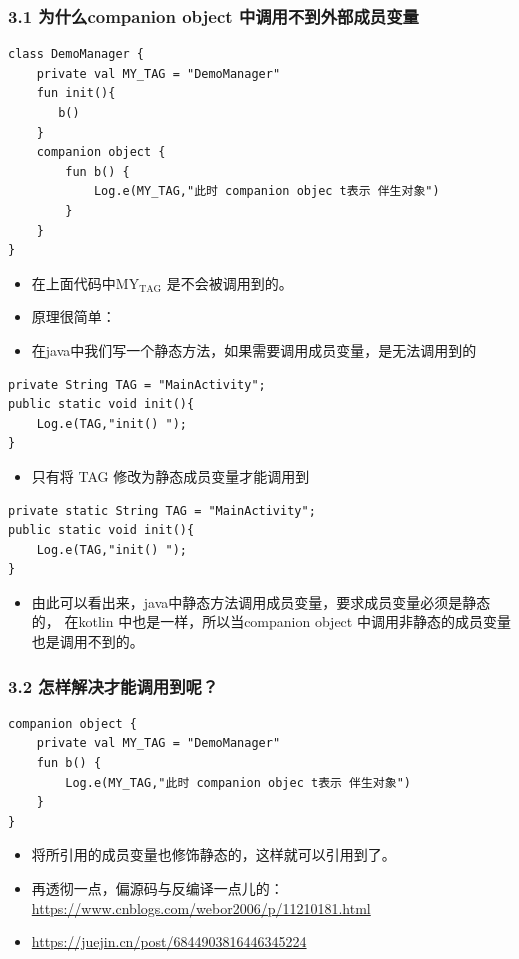 \documentclass[9pt, b5paper]{article}
\begin{document}
\subsubsection{3.1 为什么companion object 中调用不到外部成员变量}
\label{sec-3-3-1}
\begin{verbatim}
class DemoManager {
    private val MY_TAG = "DemoManager"
    fun init(){
       b()
    }
    companion object {
        fun b() {
            Log.e(MY_TAG,"此时 companion objec t表示 伴生对象")
        }
    }
}
\end{verbatim}
\begin{itemize}
\item 在上面代码中MY$_{\text{TAG}}$ 是不会被调用到的。
\item 原理很简单：
\item 在java中我们写一个静态方法，如果需要调用成员变量，是无法调用到的
\end{itemize}
\begin{verbatim}
private String TAG = "MainActivity";
public static void init(){
    Log.e(TAG,"init() ");
}
\end{verbatim}
\begin{itemize}
\item 只有将 TAG 修改为静态成员变量才能调用到
\end{itemize}
\begin{verbatim}
private static String TAG = "MainActivity";
public static void init(){
    Log.e(TAG,"init() ");
}
\end{verbatim}
\begin{itemize}
\item 由此可以看出来，java中静态方法调用成员变量，要求成员变量必须是静态的， 在kotlin 中也是一样，所以当companion object 中调用非静态的成员变量也是调用不到的。
\end{itemize}
\subsubsection{3.2 怎样解决才能调用到呢？}
\label{sec-3-3-2}
\begin{verbatim}
companion object {
    private val MY_TAG = "DemoManager"
    fun b() {
        Log.e(MY_TAG,"此时 companion objec t表示 伴生对象")
    }
}
\end{verbatim}
\begin{itemize}
\item 将所引用的成员变量也修饰静态的，这样就可以引用到了。
\item 再透彻一点，偏源码与反编译一点儿的： \url{https://www.cnblogs.com/webor2006/p/11210181.html}
\item \url{https://juejin.cn/post/6844903816446345224}
\end{itemize}
\end{document}
